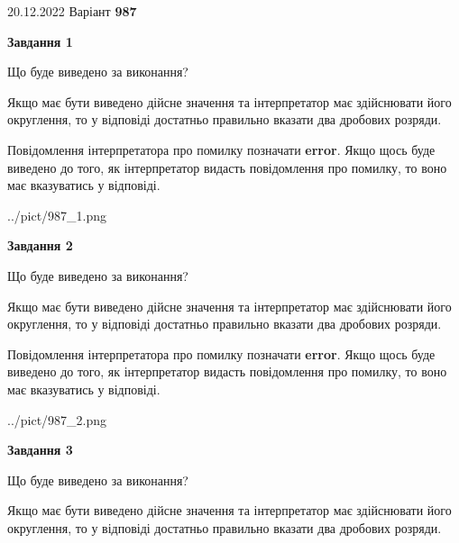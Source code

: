 \documentclass[12pt, ukrainian]{article}
\begin{document}
{20.12.2022 Варіант \No \textbf { 987 }\par}
{
\begin {Large}

{\begin {center}\textbf{Завдання 1}\end {center}}\par
Що буде виведено за виконання? \par

Якщо має бути виведено дійсне значення та інтерпретатор має здійснювати його округлення, 
то у відповіді достатньо правильно вказати два дробових розряди.

Повідомлення інтерпретатора про помилку позначати \textbf{error}.
Якщо щось буде виведено до того, як інтерпретатор видасть повідомлення про помилку, 
то воно має вказуватись у відповіді. \par

\begin{center}
	{../pict/987_1.png}
\end{center}
\newpage

{\begin {center}\textbf{Завдання 2}\end {center}}\par
Що буде виведено за виконання? \par

Якщо має бути виведено дійсне значення та інтерпретатор має здійснювати його округлення, 
то у відповіді достатньо правильно вказати два дробових розряди.

Повідомлення інтерпретатора про помилку позначати \textbf{error}.
Якщо щось буде виведено до того, як інтерпретатор видасть повідомлення про помилку, 
то воно має вказуватись у відповіді. \par

\begin{center}
	{../pict/987_2.png}
\end{center}
\newpage

{\begin {center}\textbf{Завдання 3}\end {center}}\par
Що буде виведено за виконання? \par

Якщо має бути виведено дійсне значення та інтерпретатор має здійснювати його округлення, 
то у відповіді достатньо правильно вказати два дробових розряди.


\end{Large}}
\end{document}
